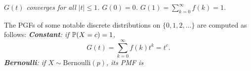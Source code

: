 \begin{remark}
\bit
\it $G(t)$ converges for all $|t|\leq 1$.
\it $G(0) = 0$.
\it $G(1)=\sum_{k=0}^{\infty} f(k) = 1$.
\eit
\end{remark}



\begin{example}
The PGFs of some notable discrete distributions on $\{0,1,2,\ldots\}$ are computed as follows:
\ben
\it \textbf{Constant}: if $\mathbb{P}(X=c)=1$,
\[
G(t) = \sum_{k=0}^\infty f(k) t^k = t^c.
\]
\it \textbf{Bernoulli}: if $X\sim\text{Bernoulli}(p)$, its PMF is %

\end{example}
